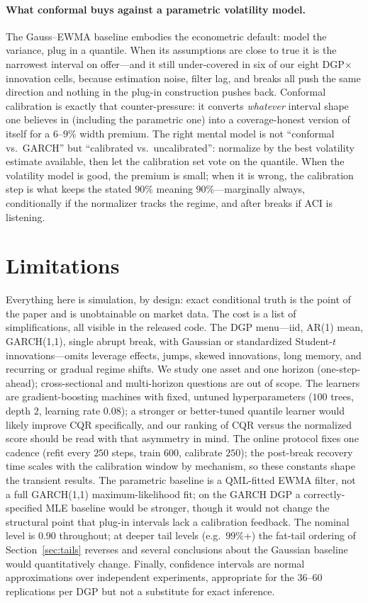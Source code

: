 \documentclass[11pt]{article}
\begin{document}
\paragraph{What conformal buys against a parametric volatility model.} The
Gauss--EWMA baseline embodies the econometric default: model the variance,
plug in a quantile. When its assumptions are close to true it is the
narrowest interval on offer---and it still under-covered in six of our eight
DGP$\times$innovation cells, because estimation noise, filter lag, and breaks
all push the same direction and nothing in the plug-in construction pushes
back. Conformal calibration is exactly that counter-pressure: it converts
\emph{whatever} interval shape one believes in (including the parametric one)
into a coverage-honest version of itself for a $6$--$9\%$ width premium. The
right mental model is not ``conformal vs.\ GARCH'' but ``calibrated vs.\
uncalibrated'': normalize by the best volatility estimate available, then let
the calibration set vote on the quantile. When the volatility model is good,
the premium is small; when it is wrong, the calibration step is what keeps the
stated $90\%$ meaning $90\%$---marginally always, conditionally if the
normalizer tracks the regime, and after breaks if ACI is listening.

\section{Limitations}
\label{sec:limitations}

Everything here is simulation, by design: exact conditional truth is the point
of the paper and is unobtainable on market data. The cost is a list of
simplifications, all visible in the released code. The DGP menu---iid, AR(1)
mean, GARCH(1,1), single abrupt break, with Gaussian or standardized
Student-$t$ innovations---omits leverage effects, jumps, skewed innovations,
long memory, and recurring or gradual regime shifts. We study one asset and
one horizon (one-step-ahead); cross-sectional and multi-horizon questions are
out of scope. The learners are gradient-boosting machines with fixed,
untuned hyperparameters ($100$ trees, depth $2$, learning rate $0.08$); a
stronger or better-tuned quantile learner would likely improve CQR
specifically, and our ranking of CQR versus the normalized score should be
read with that asymmetry in mind. The online protocol fixes one cadence
(refit every $250$ steps, train $600$, calibrate $250$); the post-break
recovery time scales with the calibration window by mechanism, so these
constants shape the transient results. The parametric baseline is a
QML-fitted EWMA filter, not a full GARCH(1,1) maximum-likelihood fit; on the
GARCH DGP a correctly-specified MLE baseline would be stronger, though it
would not change the structural point that plug-in intervals lack a
calibration feedback. The nominal level is $0.90$ throughout; at deeper tail
levels (e.g.\ $99\%$+) the fat-tail ordering of Section~\ref{sec:tails}
reverses and several conclusions about the Gaussian baseline would
quantitatively change. Finally, confidence intervals are normal
approximations over independent experiments, appropriate for the $36$--$60$
replications per DGP but not a substitute for exact inference.
\end{document}

